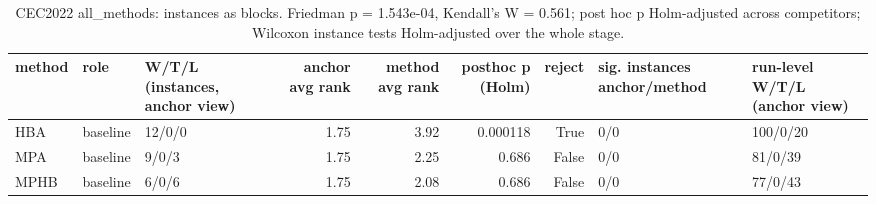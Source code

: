 \begin{table}[t]
\centering
\scriptsize
\caption{CEC2022 all_methods: instances as blocks. Friedman p = 1.543e-04, Kendall's W = 0.561; post hoc p Holm-adjusted across competitors; Wilcoxon instance tests Holm-adjusted over the whole stage.}
\label{tab:cec2022_all_methods_global}
\begin{tabular}{lllrrrrll}
\toprule
method & role & W/T/L (instances, anchor view) & anchor avg rank & method avg rank & posthoc p (Holm) & reject & sig. instances anchor/method & run-level W/T/L (anchor view) \\
\midrule
HBA & baseline & 12/0/0 & 1.75 & 3.92 & 0.000118 & True & 0/0 & 100/0/20 \\
MPA & baseline & 9/0/3 & 1.75 & 2.25 & 0.686 & False & 0/0 & 81/0/39 \\
MPHB & baseline & 6/0/6 & 1.75 & 2.08 & 0.686 & False & 0/0 & 77/0/43 \\
\bottomrule
\end{tabular}
\end{table}
